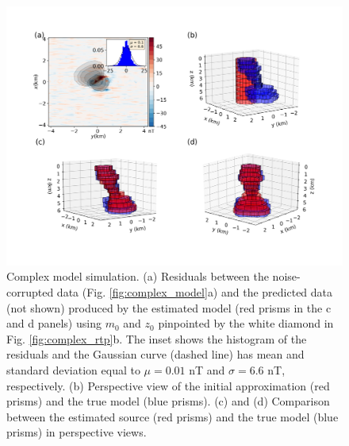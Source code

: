 \begin{figure}
    \centering
    \includegraphics[width=\linewidth]{figures/complex_results.png}
    \caption{Complex model simulation. (a) Residuals between the noise-corrupted data (Fig. \ref{fig:complex_model}a) and the predicted data (not shown) produced by the estimated model (red prisms in the c and d panels) using $m_0$  and $z_0$ pinpointed by the white diamond in Fig. \ref{fig:complex_rtp}b.
    The inset shows the histogram of the residuals and the Gaussian curve (dashed line) has mean and standard deviation equal to $\mu = 0.01$ nT and $\sigma=6.6$ nT, respectively.  (b) Perspective view of the initial approximation (red prisms) and the true model (blue prisms). (c) and (d) Comparison between the estimated source (red prisms) and the true model (blue prisms) in perspective views. 
}
    \label{fig:complex_result}
\end{figure}


